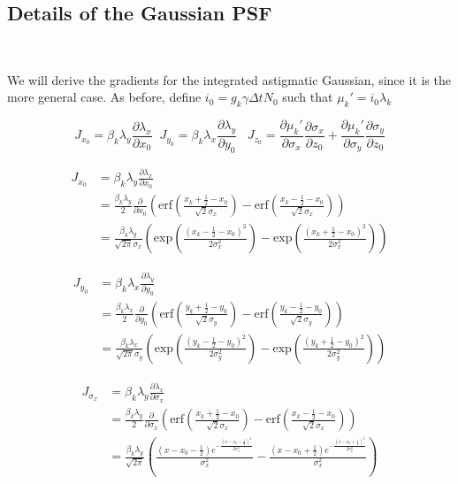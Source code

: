 \subsection{Details of the Gaussian PSF}\

We will derive the gradients for the integrated astigmatic Gaussian, since it is the more general case. As before, define $i_{0} = g_{k}\gamma\Delta t N_{0}$ such that $\mu_{k}' = i_{0}\lambda_{k}$

\begin{equation*}
J_{x_{0}} = \beta_{k}\lambda_{y}\frac{\partial \lambda_{x}}{\partial x_{0}} \;\; J_{y_{0}} = \beta_{k}\lambda_{x}\frac{\partial \lambda_{y}}{\partial y_{0}}\;\;\; J_{z_{0}}  = \frac{\partial \mu_{k}'}{\partial \sigma_{x}}\frac{\partial \sigma_{x}}{\partial z_{0}} + \frac{\partial \mu_{k}'}{\partial \sigma_{y}}\frac{\partial \sigma_{y}}{\partial z_{0}}
\end{equation*}

\begin{align*}
J_{x_{0}} &= \beta_{k}\lambda_{y}\frac{\partial \lambda_{x}}{\partial x_{0}} \\
&= \frac{\beta_{k}\lambda_{y}}{2}\frac{\partial}{\partial x_{0}}\left(\mathrm{erf}\left(\frac{x_{k}+\frac{1}{2}-x_{0}}{\sqrt{2}\sigma_{x}}\right) -\mathrm{erf}\left(\frac{x_{k}-\frac{1}{2}-x_{0}}{\sqrt{2}\sigma_{x}}\right)\right)\\
&= \frac{\beta_{k}\lambda_{y}}{\sqrt{2\pi}\sigma_{x}}\left(\mathrm{exp}\left(\frac{(x_{k}-\frac{1}{2}-x_{0})^{2}}{2\sigma_{x}^{2}}\right) -\mathrm{exp}\left(\frac{(x_{k}+\frac{1}{2}-x_{0})^{2}}{2\sigma_{x}^{2}}\right)\right)
\end{align*}

\begin{align*}
J_{y_{0}} &= \beta_{k}\lambda_{x}\frac{\partial \lambda_{y}}{\partial y_{0}} \\
&= \frac{\beta_{k}\lambda_{x}}{2}\frac{\partial}{\partial y_{0}}\left(\mathrm{erf}\left(\frac{y_{k}+\frac{1}{2}-y_{0}}{\sqrt{2}\sigma_{y}}\right) -\mathrm{erf}\left(\frac{y_{k}-\frac{1}{2}-y_{0}}{\sqrt{2}\sigma_{y}}\right)\right)\\
&= \frac{\beta_{k}\lambda_{x}}{\sqrt{2\pi}\sigma_{y}}\left(\mathrm{exp}\left(\frac{(y_{k}-\frac{1}{2}-y_{0})^{2}}{2\sigma_{y}^{2}}\right) -\mathrm{exp}\left(\frac{(y_{k}+\frac{1}{2}-y_{0})^{2}}{2\sigma_{y}^{2}}\right)\right)
\end{align*}

\begin{align*}
J_{\sigma_{x}} &= \beta_{k}\lambda_{y}\frac{\partial \lambda_{x}}{\partial \sigma_{x}} \\
&= \frac{\beta_{k}\lambda_{y}}{2}\frac{\partial}{\partial \sigma_{x}}\left(\mathrm{erf}\left(\frac{x_{k}+\frac{1}{2}-x_{0}}{\sqrt{2}\sigma_{x}}\right) -\mathrm{erf}\left(\frac{x_{k}-\frac{1}{2}-x_{0}}{\sqrt{2}\sigma_{x}}\right)\right)\\
&= \frac{\beta_{k}\lambda_{y}}{\sqrt{2\pi}}\left(\frac{\left(x-x_{0}-\frac{1}{2}\right) e^{-\frac{\left(x-x_{0}-\frac{1}{2}\right)^2}{2 \sigma_{x} ^2}}}{\sigma_{x} ^2}-\frac{ \left(x-x_{0}+\frac{1}{2}\right) e^{-\frac{\left(x-x_{0}+\frac{1}{2}\right)^2}{2 \sigma_{x} ^2}}}{\sigma_{x} ^2}\right)
\end{align*}

